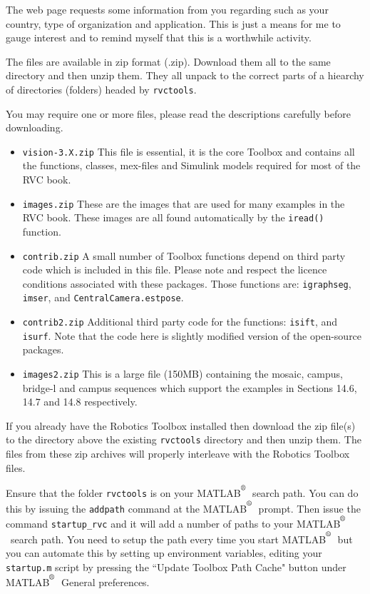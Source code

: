 \documentclass[a4paper]{report}
\def\Mlab{MATLAB$^{\textsuperscript{\textregistered}}$}
\begin{document}
The web page requests some information from you
regarding such as your country, type of organization and application.
This is just a means for me to gauge interest and to remind myself
that this is a worthwhile activity.

The files are available in zip format (.zip).  Download them all to
the same directory and then unzip them.  They
all unpack to the correct parts of a hiearchy of directories (folders)
headed by \texttt{rvctools}.

You may require one or more files, please read the descriptions carefully
before downloading.
\begin{itemize}
\item \texttt{vision-3.X.zip} This file is essential, it is the core Toolbox and contains
all the functions, classes, mex-files and Simulink models required 
for most of the RVC book.
\item \texttt{images.zip} These are the images that are used for
many examples in the RVC book.  These images are all found automatically
by the \texttt{iread()} function.
\item \texttt{contrib.zip} A small number of Toolbox functions depend on third party code which is included in this file. Please note and respect the licence conditions associated with these packages.
Those functions are: 
\texttt{igraphseg},
\texttt{imser}, and
\texttt{CentralCamera.estpose}.
\item \texttt{contrib2.zip} Additional third party code for
the functions: \texttt{isift}, and \texttt{isurf}.
Note that the code here is slightly modified version of the open-source
packages.
\item \texttt{images2.zip} This is a large file (150MB) containing the mosaic, campus, bridge-l and campus sequences which support the examples in Sections 14.6, 14.7 and 14.8 respectively.
\end{itemize}

If you already have the Robotics Toolbox installed then download
the zip file(s) to the directory above the existing \texttt{rvctools} directory
and then unzip them.
The files from these zip archives will properly interleave with the Robotics
Toolbox files.

Ensure that the folder \texttt{rvctools} is on your \Mlab\ search
path.  You can do this by issuing the \texttt{addpath} command at 
the \Mlab\ prompt.
Then issue the command \texttt{startup\_rvc} and it will add a number
of paths to your \Mlab\ search path.
You need to setup the path every time you start \Mlab\ but you can 
automate this by setting up environment variables, editing your 
\texttt{startup.m} script by pressing the ``Update Toolbox Path
Cache" button under \Mlab\ General preferences.
\end{document}
